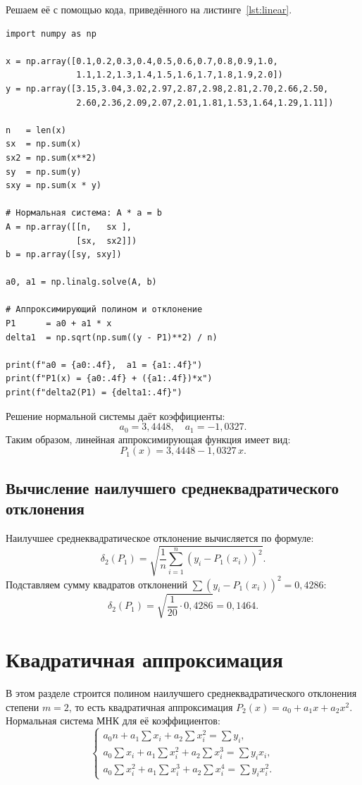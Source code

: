 \documentclass[a4paper, final]{article}
\begin{document}
Решаем её с помощью кода, приведённого на листинге~\ref{lst:linear}.

\begin{lstlisting}[caption={Линейная аппроксимация МНК}, label=lst:linear]
import numpy as np

x = np.array([0.1,0.2,0.3,0.4,0.5,0.6,0.7,0.8,0.9,1.0,
              1.1,1.2,1.3,1.4,1.5,1.6,1.7,1.8,1.9,2.0])
y = np.array([3.15,3.04,3.02,2.97,2.87,2.98,2.81,2.70,2.66,2.50,
              2.60,2.36,2.09,2.07,2.01,1.81,1.53,1.64,1.29,1.11])

n   = len(x)
sx  = np.sum(x)
sx2 = np.sum(x**2)
sy  = np.sum(y)
sxy = np.sum(x * y)

# Нормальная система: A * a = b
A = np.array([[n,   sx ],
              [sx,  sx2]])
b = np.array([sy, sxy])

a0, a1 = np.linalg.solve(A, b)

# Аппроксимирующий полином и отклонение
P1      = a0 + a1 * x
delta1  = np.sqrt(np.sum((y - P1)**2) / n)

print(f"a0 = {a0:.4f},  a1 = {a1:.4f}")
print(f"P1(x) = {a0:.4f} + ({a1:.4f})*x")
print(f"delta2(P1) = {delta1:.4f}")
\end{lstlisting}

Решение нормальной системы даёт коэффициенты:
\[
a_0 = 3{,}4448, \quad a_1 = -1{,}0327.
\]
Таким образом, линейная аппроксимирующая функция имеет вид:
\[
P_1(x) = 3{,}4448 - 1{,}0327\,x.
\]

\subsection{Вычисление наилучшего среднеквадратического отклонения}

Наилучшее среднеквадратическое отклонение вычисляется по формуле:
\[
\delta_2(P_1) = \sqrt{\frac{1}{n}\sum_{i=1}^{n}(y_i - P_1(x_i))^2}.
\]
Подставляем сумму квадратов отклонений $\sum(y_i - P_1(x_i))^2 = 0{,}4286$:
\[
\delta_2(P_1) = \sqrt{\frac{1}{20} \cdot 0{,}4286} = 0{,}1464.
\]

\newpage

\section{Квадратичная аппроксимация}

В этом разделе строится полином наилучшего среднеквадратического отклонения
степени $m = 2$, то есть квадратичная аппроксимация
$P_2(x) = a_0 + a_1 x + a_2 x^2$.
Нормальная система МНК для её коэффициентов:
\[
\begin{cases}
a_0 n + a_1 \displaystyle\sum x_i + a_2 \sum x_i^2
    = \sum y_i, \\[6pt]
a_0 \displaystyle\sum x_i + a_1 \sum x_i^2 + a_2 \sum x_i^3
    = \sum y_i x_i, \\[6pt]
a_0 \displaystyle\sum x_i^2 + a_1 \sum x_i^3 + a_2 \sum x_i^4
    = \sum y_i x_i^2.
\end{cases}
\]
\end{document}
